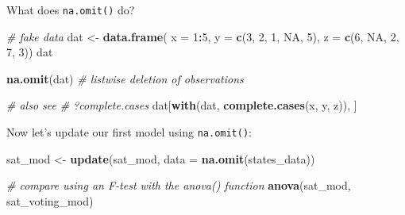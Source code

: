 \documentclass[
]{book}
\newenvironment{Shaded}{\begin{snugshade}}{\end{snugshade}}
\newcommand{\CommentTok}[1]{\textcolor[rgb]{0.56,0.35,0.01}{\textit{#1}}}
\newcommand{\DataTypeTok}[1]{\textcolor[rgb]{0.13,0.29,0.53}{#1}}
\newcommand{\DecValTok}[1]{\textcolor[rgb]{0.00,0.00,0.81}{#1}}
\newcommand{\KeywordTok}[1]{\textcolor[rgb]{0.13,0.29,0.53}{\textbf{#1}}}
\newcommand{\NormalTok}[1]{#1}
\newcommand{\OperatorTok}[1]{\textcolor[rgb]{0.81,0.36,0.00}{\textbf{#1}}}
\newcommand{\OtherTok}[1]{\textcolor[rgb]{0.56,0.35,0.01}{#1}}
\newcommand{\StringTok}[1]{\textcolor[rgb]{0.31,0.60,0.02}{#1}}
\begin{document}
\begin{Shaded}
\end{Shaded}

What does \texttt{na.omit()} do?

\begin{Shaded}
\begin{Highlighting}[]
\CommentTok{# fake data}
\NormalTok{dat <-}\StringTok{ }\KeywordTok{data.frame}\NormalTok{(}
  \DataTypeTok{x =} \DecValTok{1}\OperatorTok{:}\DecValTok{5}\NormalTok{, }
  \DataTypeTok{y =} \KeywordTok{c}\NormalTok{(}\DecValTok{3}\NormalTok{, }\DecValTok{2}\NormalTok{, }\DecValTok{1}\NormalTok{, }\OtherTok{NA}\NormalTok{, }\DecValTok{5}\NormalTok{), }
  \DataTypeTok{z =} \KeywordTok{c}\NormalTok{(}\DecValTok{6}\NormalTok{, }\OtherTok{NA}\NormalTok{, }\DecValTok{2}\NormalTok{, }\DecValTok{7}\NormalTok{, }\DecValTok{3}\NormalTok{))}
\NormalTok{dat}

\KeywordTok{na.omit}\NormalTok{(dat) }\CommentTok{# listwise deletion of observations}

\CommentTok{# also see}
\CommentTok{# ?complete.cases}
\NormalTok{dat[}\KeywordTok{with}\NormalTok{(dat, }\KeywordTok{complete.cases}\NormalTok{(x, y, z)), ]}
\end{Highlighting}
\end{Shaded}

Now let's update our first model using \texttt{na.omit()}:

\begin{Shaded}
\begin{Highlighting}[]
\NormalTok{  sat_mod <-}\StringTok{ }\KeywordTok{update}\NormalTok{(sat_mod, }\DataTypeTok{data =} \KeywordTok{na.omit}\NormalTok{(states_data))}

  \CommentTok{# compare using an F-test with the anova() function}
  \KeywordTok{anova}\NormalTok{(sat_mod, sat_voting_mod)}
\end{Highlighting}
\end{Shaded}
\end{document}
